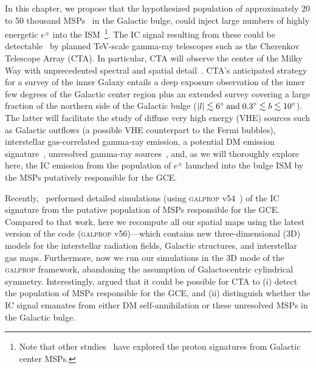 \documentclass[doublespace,nopageskip]{VTthesis} %
\begin{document}
In this chapter, we propose that the hypothesized population of approximately 20 to 50 thousand MSPs~\citep{2020JCAP...12..035P} in the Galactic bulge, could inject large numbers of highly energetic $e^{\pm}$ into the ISM~\footnote{Note that other studies~\citep[e.g.,][]{2018JCAP...07..042G} have explored the proton signatures from Galactic center MSPs.}. The  IC signal resulting from these could be detectable~\citep{2019PhRvD..99l3020S} by planned TeV-scale gamma-ray telescopes such as 
the Cherenkov Telescope Array (CTA). 
%
In particular, CTA will observe the center of the Milky Way with unprecedented spectral and spatial detail~\citep{2019scta.book.....C}. 
%
CTA's anticipated strategy for a survey of the inner Galaxy entails a deep exposure observation of the inner few degrees of the Galactic center region plus an extended survey covering a large fraction of the northern side of the Galactic bulge ($|l|\lesssim 6^{\circ}\;{\rm and}\; 0.3^{\circ}\lesssim b \lesssim 10^{\circ}$). The latter will facilitate the study of diffuse very high energy (VHE) sources such as Galactic outflows (a possible VHE counterpart to the Fermi bubbles), interstellar gas-correlated gamma-ray emission, a potential DM emission signature~\citep{2021JCAP...01..057A}, unresolved gamma-ray sources~\citep{2019ICRC...36..817V}, and, as we will thoroughly explore here, the IC emission from the 
population of $e^\pm$ launched into the bulge ISM by the
 MSPs putatively responsible for the GCE.  



Recently,~\citet{2019PhRvD..99l3020S} performed detailed simulations (using \textsc{galprop} v54~\citealt{2006ApJ...648L..29P}) of the IC signature from the putative population of MSPs responsible for the GCE. Compared to that work, here we recompute all our spatial maps using the latest version of the code (\textsc{galprop} v56)---which contains new three-dimensional (3D) models for the interstellar radiation fields, Galactic structures, and interstellar gas maps. Furthermore, now we run our simulations in the 3D mode of the \textsc{galprop} framework, abandoning the assumption of Galactocentric cylindrical symmetry. Interestingly, \cite{2019PhRvD..99l3020S} argued that it could be possible for CTA to (i) detect the population of MSPs responsible for the GCE, and (ii) distinguish whether the IC signal emanates from either DM self-annihilation or these unresolved MSPs in the Galactic bulge. 
\end{document}
